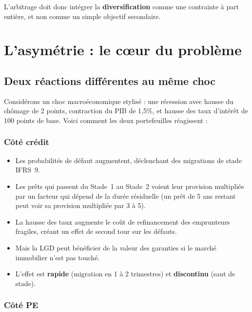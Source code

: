 \documentclass[12pt,a4paper]{article}
\begin{document}
L'arbitrage doit donc intégrer la \textbf{diversification} comme une contrainte à part entière, et non comme un simple objectif secondaire.

\section{L'asymétrie : le c\oe ur du problème}

\subsection{Deux réactions différentes au même choc}

Considérons un choc macroéconomique stylisé : une récession avec hausse du chômage de 2 points, contraction du PIB de 1,5\%, et hausse des taux d'intérêt de 100 points de base. Voici comment les deux portefeuilles réagissent :

\subsubsection{Côté crédit}

\begin{itemize}
  \item Les probabilités de défaut augmentent, déclenchant des migrations de stade IFRS~9.
  \item Les prêts qui passent du Stade~1 au Stade~2 voient leur provision multipliée par un facteur qui dépend de la durée résiduelle (un prêt de 5 ans restant peut voir sa provision multipliée par 3 à 5).
  \item La hausse des taux augmente le coût de refinancement des emprunteurs fragiles, créant un effet de second tour sur les défauts.
  \item Mais la LGD peut bénéficier de la valeur des garanties si le marché immobilier n'est pas touché.
  \item L'effet est \textbf{rapide} (migration en 1 à 2 trimestres) et \textbf{discontinu} (saut de stade).
\end{itemize}

\subsubsection{Côté PE}
\end{document}
